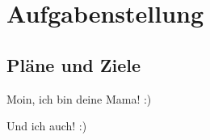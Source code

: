 \chapter{Aufgabenstellung}

\section{Pläne und Ziele}

Moin, ich bin deine Mama! :)

\newpage

Und ich auch! :)

